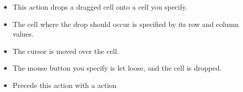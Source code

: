 
\begin{itemize}
\item This action drops a dragged cell onto a cell you specify.
\item The cell where the drop should occur is specified by its row and column values.
\item The cursor is moved over the cell.
\item The mouse button you specify is let loose, and the cell is dropped. 
\item Precede this action with a  action
\end{itemize}

